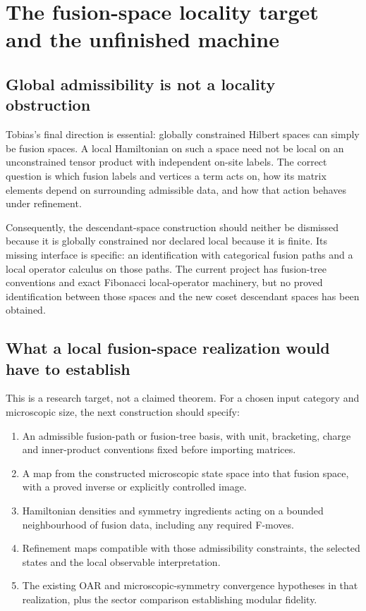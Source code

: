 \section{The fusion-space locality target and the unfinished machine}

\subsection{Global admissibility is not a locality obstruction}

Tobias's final direction is essential: globally constrained Hilbert spaces
can simply be fusion spaces. A local Hamiltonian on such a space need not
be local on an unconstrained tensor product with independent on-site labels.
The correct question is which fusion labels and vertices a term acts on,
how its matrix elements depend on surrounding admissible data, and how that
action behaves under refinement.

Consequently, the descendant-space construction should neither be dismissed
because it is globally constrained nor declared local because it is finite.
Its missing interface is specific: an identification with categorical fusion
paths and a local operator calculus on those paths. The current project has
fusion-tree conventions and exact Fibonacci local-operator machinery, but
no proved identification between those spaces and the new coset descendant
spaces has been obtained.

\subsection{What a local fusion-space realization would have to establish}

This is a research target, not a claimed theorem. For a chosen input category
and microscopic size, the next construction should specify:
\begin{enumerate}
\item An admissible fusion-path or fusion-tree basis, with unit, bracketing,
charge and inner-product conventions fixed before importing matrices.
\item A map from the constructed microscopic state space into that fusion
space, with a proved inverse or explicitly controlled image.
\item Hamiltonian densities and symmetry ingredients acting on a bounded
neighbourhood of fusion data, including any required F-moves.
\item Refinement maps compatible with those admissibility constraints,
the selected states and the local observable interpretation.
\item The existing OAR and microscopic-symmetry convergence hypotheses in
that realization, plus the sector comparison establishing modular fidelity.
\end{enumerate}

